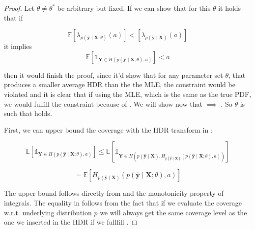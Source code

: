 \begin{proof}
    Let $\theta \neq \theta^*$ be arbitrary but fixed. If we can show that for this $\theta$ it holds that if

    \begin{equation}
        \mathbb{E} \left[ \lambda_{p(\mathbf{\hat{y}}\mid\mathbf{X};\theta)}(a)\right]
        <
        \left[\lambda_{p(\mathbf{\hat{y}}\mid\mathbf{X})}(a) \right]
        \label{eq:inequality_00}
    \end{equation}
    it implies
    \begin{equation}
        \mathbb{E} \left[ \mathds{1}_{\mathbf{Y} \in
        H(p(\mathbf{\hat{y}}\mid \mathbf{X}; \theta), a)} \right] < a
        \label{eq:inequality_01}
    \end{equation}

    then it would finish the proof, since it'd show that for any parameter set $\theta$, that produces a smaller average HDR than the the MLE, the constraint would be violated and it is clear that if using the MLE, which is the same as the true PDF, we would fulfill the constraint because of . We will show now that  $\implies$ . So  $\theta$ is such that  holds.

    First, we can upper bound the coverage with the HDR transform in :

    \begin{equation}
        \mathbb{E} \left[ \mathds{1}_{\mathbf{Y} \in
        H(p(\mathbf{\hat{y}}\mid \mathbf{X}; \theta), a)} \right]
        \leq
        \mathbb{E} \left[ \mathds{1}_{\mathbf{Y} \in
        H(p(\mathbf{\hat{y}} \mid \mathbf{X}), H_{p(\hat{\mathbf{y}}\mid \mathbf{X})}(p(\mathbf{\hat{y}}\mid
        \mathbf{X};
        \theta), a))} \right]
        \label{eq:upper_bound}
    \end{equation}

    \begin{equation}
        = \mathbb{E}\left[H_{p(\hat{\mathbf{y}}\mid \mathbf{X})}(p(\mathbf{\hat{y}}\mid \mathbf{X}; \theta),
            a)
            \right]
        \label{eq:upper_bound_2}
    \end{equation}

    The upper bound follows directly from  and the monotonicity property of integrals. The equality in  follows from the fact that if we evaluate the coverage w.r.t. underlying distribution $p$ we will always get the same coverage level as the one we inserted in the HDR if we fullfill .


\end{proof}
